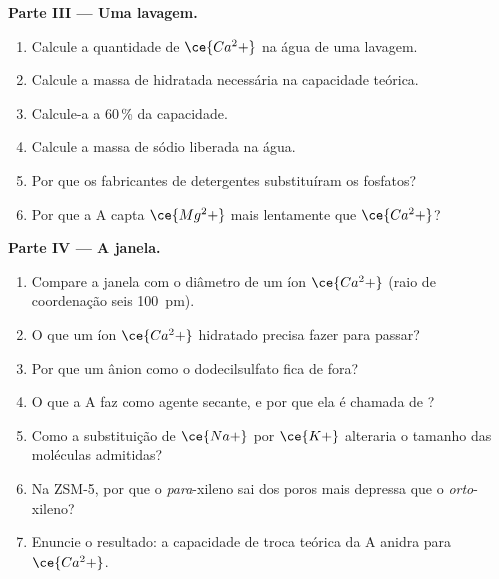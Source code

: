 \begin{problem}
\medskip\noindent\textbf{Parte III --- Uma lavagem.}
\begin{enumerate}[resume]
  \item Calcule a quantidade de $\ce{Ca^2+}$ na água de uma lavagem.
  \item Calcule a massa de  hidratada necessária na capacidade teórica.
  \item Calcule-a a 60\,\% da capacidade.
  \item Calcule a massa de sódio liberada na água.
  \item Por que os fabricantes de detergentes substituíram os fosfatos?
  \item Por que a  A capta $\ce{Mg^2+}$ mais lentamente que $\ce{Ca^2+}$?
\end{enumerate}

\medskip\noindent\textbf{Parte IV --- A janela.}
\begin{enumerate}[resume]
  \item Compare a janela com o diâmetro de um íon $\ce{Ca^2+}$ (raio de coordenação seis
        \qty{100}{pm}).
  \item O que um íon $\ce{Ca^2+}$ hidratado precisa fazer para passar?
  \item Por que um ânion  como o dodecilsulfato fica de fora?
  \item O que a  A faz como agente secante, e por que ela é chamada de
        ?
  \item Como a substituição de $\ce{Na+}$ por $\ce{K+}$ alteraria o tamanho das moléculas admitidas?
  \item Na ZSM-5, por que o \textit{para}-xileno sai dos poros mais depressa que o \textit{orto}-xileno?
  \item Enuncie o resultado: a capacidade de troca teórica da  A anidra
        para $\ce{Ca^2+}$.
\end{enumerate}
\end{problem}
